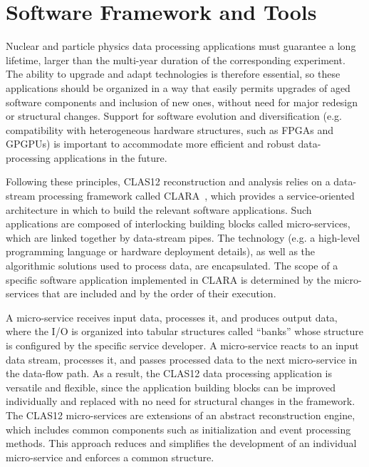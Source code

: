 \section{Software Framework and Tools}
\label{sec:framework}

Nuclear and particle physics data processing applications must guarantee a long lifetime, larger than the multi-year
duration of the corresponding experiment. The ability to upgrade and adapt technologies is therefore essential, so
these applications should be organized in a way that easily permits upgrades of aged software components and
inclusion of new ones, without need for major redesign or structural changes. Support for software evolution and
diversification (e.g. compatibility with heterogeneous hardware structures, such as FPGAs and GPGPUs) is important
to accommodate more efficient and robust data-processing applications in the future.

Following these principles, CLAS12 reconstruction and analysis relies on a data-stream processing framework called
CLARA~\cite{clara-2011,clara-service,framework,clara-2016}, which provides a service-oriented architecture in which
to build the relevant software applications.  Such applications are composed of interlocking building blocks called
micro-services, which are linked together by data-stream pipes. The technology (e.g. a high-level programming
language or hardware deployment details), as well as the algorithmic solutions used to process data, are encapsulated. 
The scope of a specific software application implemented in CLARA is determined by the micro-services that are
included and by the order of their execution.

A micro-service receives input data, processes it, and produces output data, where the I/O is organized into
tabular structures called ``banks'' whose structure is configured by the specific service developer. A
micro-service reacts to an input data stream, processes it, and passes processed data to the next micro-service
in the data-flow path. As a result, the CLAS12 data processing application is versatile and flexible, since the
application building blocks can be improved individually and replaced with no need for structural changes in the
framework. The CLAS12 micro-services are extensions of an abstract reconstruction engine, which includes
common components such as initialization and event processing methods. This approach reduces and simplifies the
development of an individual micro-service and enforces a common structure. 

